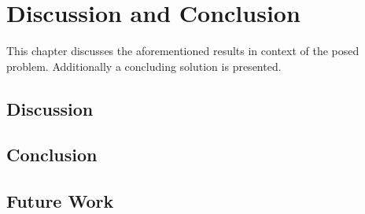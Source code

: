 \part{Discussion and Conclusion}

This chapter discusses the aforementioned results in context of the posed problem.
Additionally a concluding solution is presented.

\chapter{Discussion}
\chapter{Conclusion}
\chapter{Future Work}